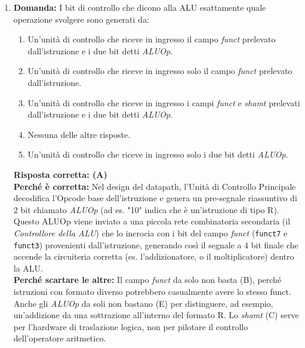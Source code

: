 \documentclass[12pt, a4paper]{article}
\begin{document}
\begin{enumerate}
\newpage
    
    \textbf{Risposta corretta: (C)} \\
    \textbf{Perché è corretta:} Quando scatta un'eccezione, l'hardware del processore esegue un cambio di contesto forzato passando il controllo al Sistema Operativo e riempiendo automaticamente dei registri speciali di stato (i CSR, o Coprocessor 0 in MIPS). L'handler software inizierà la sua esecuzione proprio leggendo il registro \texttt{SCAUSE} (o \texttt{Cause}) per capire chi ha generato l'errore o l'interrupt, e userà il registro \texttt{SEPC} (o \texttt{EPC}) per sapere a quale punto del programma tornare a fine esecuzione. \\
    \textbf{Perché scartare le altre:} Un handler è un normalissimo pezzo di codice software risiedente nel kernel del SO (non inalterabile in hardware) (A). L'interrupt serve proprio ad \textit{evitare} il polling, non attende che finisca (B). È assolutamente in grado di capire la causa (D), altrimenti non saprebbe come gestire l'errore.

    \item \textbf{Domanda:} I bit di controllo che dicono alla ALU esattamente quale operazione svolgere sono generati da:
    \begin{enumerate}[label=(\Alph*)]
        \item Un'unità di controllo che riceve in ingresso il campo \textit{funct} prelevato dall'istruzione e i due bit detti \textit{ALUOp}.
        \item Un'unità di controllo che riceve in ingresso solo il campo \textit{funct} prelevato dall'istruzione.
        \item Un'unità di controllo che riceve in ingresso i campi \textit{funct} e \textit{shamt} prelevati dall'istruzione e i due bit detti \textit{ALUOp}.
        \item Nessuna delle altre risposte.
        \item Un'unità di controllo che riceve in ingresso solo i due bit detti \textit{ALUOp}.
    \end{enumerate}
    \textbf{Risposta corretta: (A)} \\
    \textbf{Perché è corretta:} Nel design del datapath, l'Unità di Controllo Principale decodifica l'Opcode base dell'istruzione e genera un pre-segnale riassuntivo di 2 bit chiamato \textit{ALUOp} (ad es. "10" indica che è un'istruzione di tipo R). Questo ALUOp viene inviato a una piccola rete combinatoria secondaria (il \textit{Controllore della ALU}) che lo incrocia con i bit del campo \textit{funct} (\texttt{funct7} e \texttt{funct3}) provenienti dall'istruzione, generando così il segnale a 4 bit finale che accende la circuiteria corretta (es. l'addizionatore, o il moltiplicatore) dentro la ALU. \\
    \textbf{Perché scartare le altre:} Il campo \textit{funct} da solo non basta (B), perché istruzioni con formato diverso potrebbero casualmente avere lo stesso funct. Anche gli \textit{ALUOp} da soli non bastano (E) per distinguere, ad esempio, un'addizione da una sottrazione all'interno del formato R. Lo \textit{shamt} (C) serve per l'hardware di traslazione logica, non per pilotare il controllo dell'operatore aritmetico.


\end{enumerate}
\end{document}
